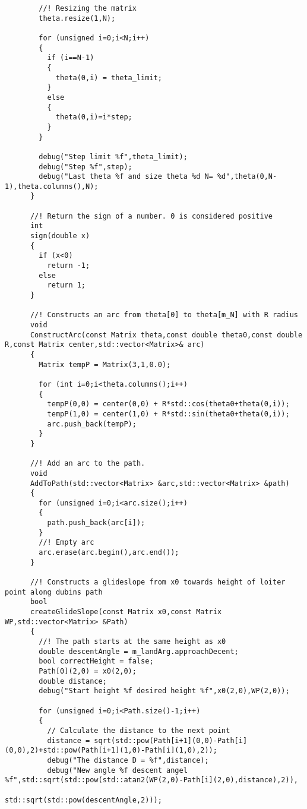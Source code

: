 \begin{frame}[fragile]
\begin{lstlisting}
        //! Resizing the matrix
        theta.resize(1,N);

        for (unsigned i=0;i<N;i++)
        {
          if (i==N-1)
          {
            theta(0,i) = theta_limit;
          }
          else
          {
            theta(0,i)=i*step;
          }
        }

        debug("Step limit %f",theta_limit);
        debug("Step %f",step);
        debug("Last theta %f and size theta %d N= %d",theta(0,N-1),theta.columns(),N);
      }

      //! Return the sign of a number. 0 is considered positive
      int
      sign(double x)
      {
        if (x<0)
          return -1;
        else
          return 1;
      }

      //! Constructs an arc from theta[0] to theta[m_N] with R radius
      void
      ConstructArc(const Matrix theta,const double theta0,const double R,const Matrix center,std::vector<Matrix>& arc)
      {
        Matrix tempP = Matrix(3,1,0.0);

        for (int i=0;i<theta.columns();i++)
        {
          tempP(0,0) = center(0,0) + R*std::cos(theta0+theta(0,i));
          tempP(1,0) = center(1,0) + R*std::sin(theta0+theta(0,i));
          arc.push_back(tempP);
        }
      }

      //! Add an arc to the path.
      void
      AddToPath(std::vector<Matrix> &arc,std::vector<Matrix> &path)
      {
        for (unsigned i=0;i<arc.size();i++)
        {
          path.push_back(arc[i]);
        }
        //! Empty arc
        arc.erase(arc.begin(),arc.end());
      }

      //! Constructs a glideslope from x0 towards height of loiter point along dubins path
      bool
      createGlideSlope(const Matrix x0,const Matrix WP,std::vector<Matrix> &Path)
      {
        //! The path starts at the same height as x0
        double descentAngle = m_landArg.approachDecent;
        bool correctHeight = false;
        Path[0](2,0) = x0(2,0);
        double distance;
        debug("Start height %f desired height %f",x0(2,0),WP(2,0));

        for (unsigned i=0;i<Path.size()-1;i++)
        {
          // Calculate the distance to the next point
          distance = sqrt(std::pow(Path[i+1](0,0)-Path[i](0,0),2)+std::pow(Path[i+1](1,0)-Path[i](1,0),2));
          debug("The distance D = %f",distance);
          debug("New angle %f descent angel %f",std::sqrt(std::pow(std::atan2(WP(2,0)-Path[i](2,0),distance),2)),
                                                std::sqrt(std::pow(descentAngle,2)));


\end{lstlisting}
\end{frame}
